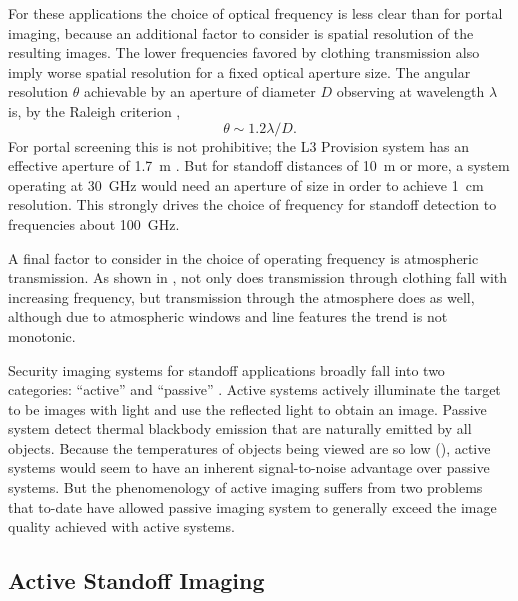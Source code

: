 For these applications the choice of optical frequency is less clear than for portal imaging, because an additional factor to consider is spatial resolution of the resulting images.
The lower frequencies favored by clothing transmission also imply worse spatial resolution for a fixed optical aperture size.
The angular resolution $\theta$ achievable by an aperture of diameter $D$ observing at wavelength $\lambda$ is, by the Raleigh criterion \cite{born_principles_1999},
\begin{equation} \label{eqn:ch1-raleigh}
  \theta \sim 1.2 \lambda / D.
\end{equation}
For portal screening this is not prohibitive; the L3 Provision system has an effective aperture of \SI{1.7}{\m} \cite{mcmakin_dual-surface_2009}.
But for standoff distances of \SI{10}{\m} or more, a system operating at \SI{30}{\GHz} would need an aperture of size  in order to achieve \SI{1}{\cm} resolution.
This strongly drives the choice of frequency for standoff detection to frequencies about \SI{100}{\GHz}.

A final factor to consider in the choice of operating frequency is atmospheric transmission.
As shown in , not only does transmission through clothing fall with increasing frequency, but transmission through the atmosphere does as well, although due to atmospheric windows and line features the trend is not monotonic.

Security imaging systems for standoff applications broadly fall into two categories: ``active'' and ``passive'' \cite{appleby_standoff_2007,appleby_passive_2004}.
Active systems actively illuminate the target to be images with light and use the reflected light to obtain an image.
Passive system detect thermal blackbody emission that are naturally emitted by all objects.
Because the temperatures of objects being viewed are so low (), active systems would seem to have an inherent signal-to-noise advantage over passive systems.
But the phenomenology of active imaging suffers from two problems that to-date have allowed passive imaging system to generally exceed the image quality achieved with active systems.

\subsection{Active Standoff Imaging}


